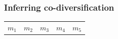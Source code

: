 \begin{frame}[t]
    \frametitle{Inferring co-diversification}

    \vspace{-9mm}

    \begin{minipage}[t][0.1\textheight][c]{1.1\linewidth}
        \begin{adjustwidth}{-0.5em}{}
            \begin{tabular}{ p{2.1cm} p{2.1cm} p{2.1cm} p{2.1cm} p{2.1cm} }
                $m_1$ & $m_2$ & $m_3$ & $m_4$ & $m_5$ \\
            \end{tabular}
        \end{adjustwidth}
    \end{minipage}

    \vspace{-2mm}


\end{frame}
